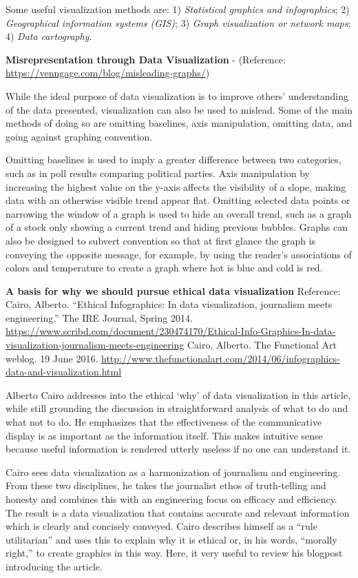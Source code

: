 \documentclass[]{book}
\theoremstyle{definition}
\theoremstyle{definition}
\theoremstyle{definition}
\theoremstyle{remark}
\begin{document}
Some useful visualization methods are: 1) \emph{Statistical graphics and
infographics}; 2) \emph{Geographical information systems (GIS)}; 3)
\emph{Graph visualization or network maps}; 4) \emph{Data cartography}.

\textbf{Misrepresentation through Data Visualization} - (Reference:
\url{https://venngage.com/blog/misleading-graphs/})

While the ideal purpose of data visualization is to improve others'
understanding of the data presented, visualization can also be used to
mislead. Some of the main methods of doing so are omitting baselines,
axis manipulation, omitting data, and going against graphing convention.

Omitting baselines is used to imply a greater difference between two
categories, such as in poll results comparing political parties. Axis
manipulation by increasing the highest value on the y-axis affects the
visibility of a slope, making data with an otherwise visible trend
appear flat. Omitting selected data points or narrowing the window of a
graph is used to hide an overall trend, such as a graph of a stock only
showing a current trend and hiding previous bubbles. Graphs can also be
designed to subvert convention so that at first glance the graph is
conveying the opposite message, for example, by using the reader's
associations of colors and temperature to create a graph where hot is
blue and cold is red.

\textbf{A basis for why we should pursue ethical data visualization}
Reference: Cairo, Alberto. ``Ethical Infographics: In data
visualization, journalism meets engineering.'' The IRE Journal, Spring
2014.
\url{https://www.scribd.com/document/230474170/Ethical-Info-Graphics-In-data-visualization-journalism-meets-engineering}
Cairo, Alberto. The Functional Art weblog. 19 June 2016.
\url{http://www.thefunctionalart.com/2014/06/infographics-data-and-visualization.html}

Alberto Cairo addresses into the ethical `why' of data visualization in
this article, while still grounding the discussion in straightforward
analysis of what to do and what not to do. He emphasizes that the
effectiveness of the communicative display is as important as the
information itself. This makes intuitive sense because useful
information is rendered utterly useless if no one can understand it.

Cairo sees data visualization as a harmonization of journalism and
engineering. From these two disciplines, he takes the journalist ethos
of truth-telling and honesty and combines this with an engineering focus
on efficacy and efficiency. The result is a data visualization that
contains accurate and relevant information which is clearly and
concisely conveyed. Cairo describes himself as a ``rule utilitarian''
and uses this to explain why it is ethical or, in his words, ``morally
right,'' to create graphics in this way. Here, it very useful to review
his blogpost introducing the article.
\end{document}
